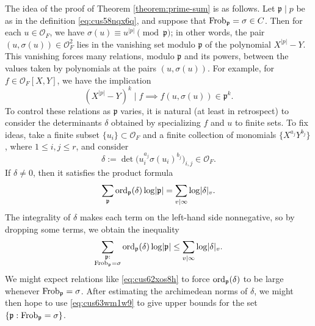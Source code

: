 \documentclass[reqno]{amsart} 
\begin{document}
The idea of the proof of Theorem \ref{theorem:prime-sum} is as follows.  Let $\mathfrak{p} \mid p$ be as in the definition \eqref{eq:cus58nqx6q}, and suppose that $\operatorname{Frob}_{\mathfrak{p}} = \sigma \in C$.  Then for each \(u\in\mathcal O_F\), we have \(\sigma(u)\equiv u^{|p|}\pmod{\mathfrak p}\); in other words, the pair $(u, \sigma(u)) \in \mathcal{O}_F^2$ lies in the vanishing set modulo $\mathfrak{p}$ of the polynomial $X^{\lvert p \rvert} - Y$.  This vanishing forces many relations, modulo $\mathfrak{p}$ and its powers, between the values taken by polynomials at the pairs $(u, \sigma(u))$.  For example, for $f \in \mathcal{O}_F[X, Y]$, we have the implication
\begin{equation}\label{eq:cus62xos8h}
  (X^{\lvert p \rvert} - Y)^k \mid f \implies 
  f(u, \sigma(u)) \in \mathfrak{p}^k.
\end{equation}
To control these relations as $\mathfrak{p}$ varies, it is natural (at least in retrospect) to consider the determinants $\delta$ obtained by specializing $f$ and $u$ to finite sets.  To fix ideas, take a finite subset $\{u_i\} \subset \mathcal{O}_F$ and a finite collection of monomials $\{X^{a_j} Y^{b_j}\}$, where $1 \leq i, j \leq r$, and consider
\begin{equation}\label{eq:cus642yldw}
  \delta := \det \bigl( u_i^{a_j} \sigma(u_i)^{b_j} \bigr)_{i, j} \in \mathcal{O}_F.
\end{equation}
If $\delta \neq 0$, then it satisfies the product formula
\begin{equation}\label{eq:cus62z6mr2}
  \sum_{\mathfrak{p}} \operatorname{ord}_{\mathfrak{p}}(\delta) \log \lvert \mathfrak{p} \rvert = \sum_{v \mid \infty} \log \lvert \delta \rvert_v.
\end{equation}
The integrality of $\delta$ makes each term on the left-hand side nonnegative, so by dropping some terms, we obtain the inequality
\begin{equation}\label{eq:cus63wm1w9}
  \sum_{
    \substack{
      \mathfrak{p} :  \\
      \operatorname{Frob}_{\mathfrak{p}} = \sigma      
    }
  }
  \operatorname{ord}_{\mathfrak{p}}(\delta) \log \lvert \mathfrak{p} \rvert \leq \sum_{v \mid \infty} \log \lvert \delta \rvert_v.
\end{equation}
We might expect relations like \eqref{eq:cus62xos8h} to force $\operatorname{ord}_{\mathfrak{p}}(\delta)$ to be large whenever $\operatorname{Frob}_{\mathfrak{p}} = \sigma$.  After estimating the archimedean norms of $\delta$, we might then hope to use \eqref{eq:cus63wm1w9} to give upper bounds for the set $\{\mathfrak{p} : \operatorname{Frob}_{\mathfrak{p}} = \sigma\}$.
\end{document}
